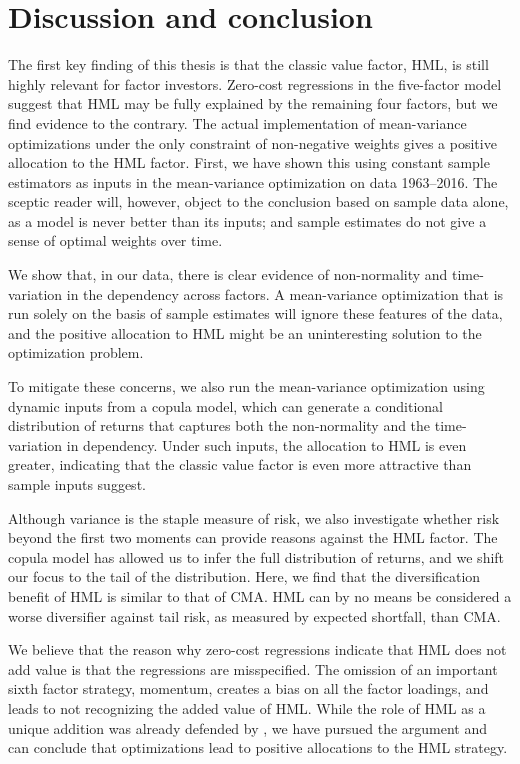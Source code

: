 
\section{Discussion and conclusion} %
\label{sec:discussion_conclusion}

The first key finding of this thesis is that the classic value factor, HML, is still highly relevant for factor investors. Zero-cost regressions in the five-factor model suggest that HML may be fully explained by the remaining four factors, but we find evidence to the contrary. The actual implementation of mean-variance optimizations under the only constraint of non-negative weights gives a positive allocation to the HML factor. First, we have shown this using constant sample estimators as inputs in the mean-variance optimization on data 1963--2016. The sceptic reader will, however, object to the conclusion based on sample data alone, as a model is never better than its inputs; and sample estimates do not give a sense of optimal weights over time.

We show that, in our data, there is clear evidence of non-normality and time-variation in the dependency across factors. A mean-variance optimization that is run solely on the basis of sample estimates will ignore these features of the data, and the positive allocation to HML might be an uninteresting solution to the optimization problem.

To mitigate these concerns, we also run the mean-variance optimization using dynamic inputs from a copula model, which can generate a conditional distribution of returns that captures both the non-normality and the time-variation in dependency. Under such inputs, the allocation to HML is even greater, indicating that the classic value factor is even more attractive than sample inputs suggest.

Although variance is the staple measure of risk, we also investigate whether risk beyond the first two moments can provide reasons against the HML factor. The copula model has allowed us to infer the full distribution of returns, and we shift our focus to the tail of the distribution. Here, we find that the diversification benefit of HML is similar to that of CMA. HML can by no means be considered a worse diversifier against tail risk, as measured by expected shortfall, than CMA.

We believe that the reason why zero-cost regressions indicate that HML does not add value is that the regressions are misspecified. The omission of an important sixth factor strategy, momentum, creates a bias on all the factor loadings, and leads to not recognizing the added value of HML. While the role of HML as a unique addition was already defended by \textcite{Asness2015}, we have pursued the argument and can conclude that optimizations lead to positive allocations to the HML strategy.

